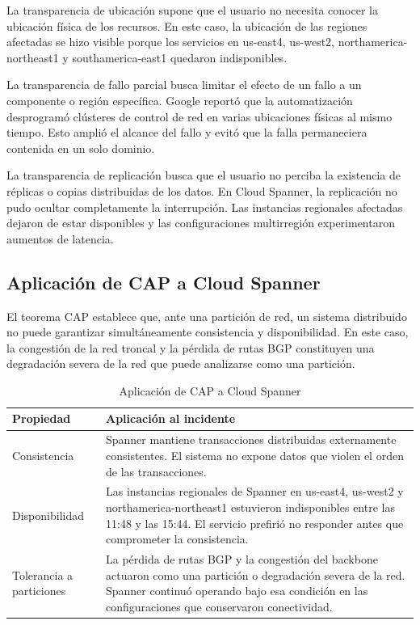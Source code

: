 \documentclass[11pt]{article}
\begin{document}
La transparencia de ubicación supone que el usuario no necesita conocer la ubicación física de
los recursos. En este caso, la ubicación de las regiones afectadas se hizo visible porque los
servicios en us-east4, us-west2, northamerica-northeast1 y southamerica-east1 quedaron
indisponibles. \cite{googlecloud19009}

La transparencia de fallo parcial busca limitar el efecto de un fallo a un componente o región
específica. Google reportó que la automatización desprogramó clústeres de control de red en
varias ubicaciones físicas al mismo tiempo. Esto amplió el alcance del fallo y evitó que la
falla permaneciera contenida en un solo dominio. \cite{googlecloud19009}

La transparencia de replicación busca que el usuario no perciba la existencia de réplicas o
copias distribuidas de los datos. En Cloud Spanner, la replicación no pudo ocultar
completamente la interrupción. Las instancias regionales afectadas dejaron de estar
disponibles y las configuraciones multirregión experimentaron aumentos de latencia.
\cite{googlecloud19009}

\subsection{Aplicación de CAP a Cloud Spanner}

El teorema CAP establece que, ante una partición de red, un sistema distribuido no puede
garantizar simultáneamente consistencia y disponibilidad. En este caso, la congestión de la
red troncal y la pérdida de rutas BGP constituyen una degradación severa de la red que puede
analizarse como una partición. \cite{googlecloud19009}

\begin{table}[htbp]
\centering
\caption{Aplicación de CAP a Cloud Spanner}
\label{tab:cap}
\small
\begin{tabularx}{\textwidth}{p{3cm}X}
\hline
\textbf{Propiedad} & \textbf{Aplicación al incidente} \\
\hline
Consistencia & Spanner mantiene transacciones distribuidas externamente consistentes. El
sistema no expone datos que violen el orden de las transacciones. \cite{corbett2013spanner} \\
Disponibilidad & Las instancias regionales de Spanner en us-east4, us-west2 y
northamerica-northeast1 estuvieron indisponibles entre las 11:48 y las 15:44. El servicio
prefirió no responder antes que comprometer la consistencia. \cite{googlecloud19009} \\
Tolerancia a particiones & La pérdida de rutas BGP y la congestión del backbone actuaron como
una partición o degradación severa de la red. Spanner continuó operando bajo esa condición en
las configuraciones que conservaron conectividad. \cite{googlecloud19009} \\
\hline
\end{tabularx}
\end{table}
\end{document}
